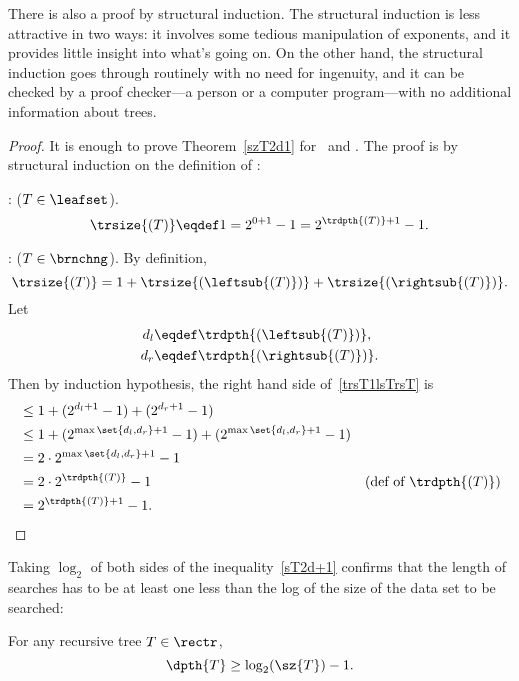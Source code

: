 \begin{definition}
There is also a proof by structural induction.  The structural
induction is less attractive in two ways: it involves some tedious
manipulation of exponents, and it provides little insight into what's
going on.  On the other hand, the structural induction goes through
routinely with no need for ingenuity, and it can be checked by a proof
checker---a person or a computer program---with no additional
information about trees.

\begin{proof} 
It is enough to prove Theorem~\ref{szT2d1} for \trsize\ and \trdpth.
The proof is by structural induction on the definition of \rectr:

: ($T \in \leafset$).
\[
\trsize{(T)} \eqdef 1 = 2^{0+1} - 1 = 2^{\trdpth{(T)}+1} - 1.
\]

: ($T \in \brnchng$).
By definition,
\begin{equation}\label{trsT1lsTrsT}
\trsize{(T)} = 1 + \trsize{(\leftsub{(T)})} + \trsize{(\rightsub{(T)})}.
\end{equation}
Let
\begin{align*}
d_l & \eqdef \trdpth{(\leftsub{(T)})},\\
d_r & \eqdef \trdpth{(\rightsub{(T)})}.
\end{align*}
Then by induction hypothesis, the right hand side of~\eqref{trsT1lsTrsT} is
\begin{align*}
& \leq 1 + (2^{d_l+1} -1)  + (2^{d_r+1} -1)\\
& \leq 1 + (2^{\max\set{d_l,d_r}+1} -1)  + (2^{\max\set{d_l,d_r}+1} -1)\\
& = 2\cdot 2^{\max\set{d_l,d_r}+1} - 1\\
& = 2\cdot 2^{\trdpth{(T)}} - 1
              & \text{(def of $\trdpth{(T)}$)}\\
& =  2^{\trdpth{(T)}+1} - 1.
\end{align*}
\end{proof}

Taking $\log_2$ of both sides of the inequality~\eqref{sT2d+1}
confirms that the length of searches has to be at least one less than
the log of the size of the data set to be searched:

\begin{corollary}
For any recursive tree $T \in \rectr$,
\begin{equation}\label{}
\dpth{T} \geq \log_2(\sz{T}) - 1.
\end{equation}
\end{corollary}


\end{definition}
